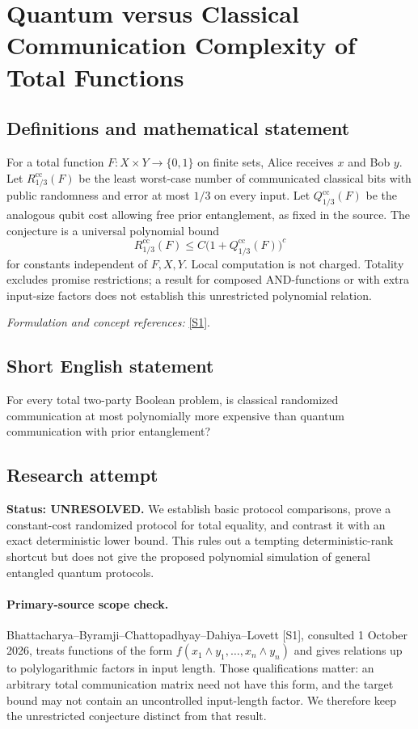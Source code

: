\documentclass[11pt]{article}
\begin{document}
\section*{\texorpdfstring{Quantum versus Classical Communication Complexity of Total Functions}{Quantum versus Classical Communication Complexity of Total Functions}}\label{statement}
\subsection{Definitions and mathematical statement}
For a total function $F:X\times Y\to\{0,1\}$ on finite sets, Alice receives $x$ and Bob $y$. Let $R^{\mathrm{cc}}_{1/3}(F)$ be the least worst-case number of communicated classical bits with public randomness and error at most $1/3$ on every input. Let $Q^{\mathrm{cc}}_{1/3}(F)$ be the analogous qubit cost allowing free prior entanglement, as fixed in the source. The conjecture is a universal polynomial bound
\[
 R^{\mathrm{cc}}_{1/3}(F)\le C\bigl(1+Q^{\mathrm{cc}}_{1/3}(F)\bigr)^c
\]
for constants independent of $F,X,Y$. Local computation is not charged. Totality excludes promise restrictions; a result for composed AND-functions or with extra input-size factors does not establish this unrestricted polynomial relation.
\par\smallskip\textit{Formulation and concept references:} \href{https://eccc.weizmann.ac.il/report/2026/013/download}{[S1]}.

\subsection{Short English statement}
For every total two-party Boolean problem, is classical randomized communication at most polynomially more expensive than quantum communication with prior entanglement?
\subsection{Research attempt}
\textbf{Status: UNRESOLVED.} We establish basic protocol comparisons, prove a constant-cost randomized protocol for total equality, and contrast it with an exact deterministic lower bound. This rules out a tempting deterministic-rank shortcut but does not give the proposed polynomial simulation of general entangled quantum protocols.

\paragraph{Primary-source scope check.}
Bhattacharya--Byramji--Chattopadhyay--Dahiya--Lovett [S1], consulted 1 October 2026, treats functions of the form $f(x_1\wedge y_1,\ldots,x_n\wedge y_n)$ and gives relations up to polylogarithmic factors in input length. Those qualifications matter: an arbitrary total communication matrix need not have this form, and the target bound may not contain an uncontrolled input-length factor. We therefore keep the unrestricted conjecture distinct from that result.
\end{document}
